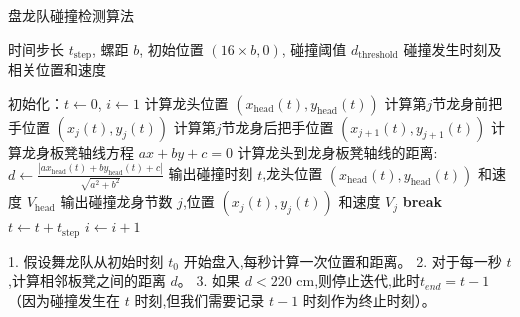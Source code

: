 \begin{breakablealgorithm}
	\caption{盘龙队碰撞检测算法}
	\begin{algorithmic}[1]
		\Require 时间步长 $t_{\text{step}}$, 螺距 $b$, 初始位置 $(16 \times b, 0)$, 碰撞阈值 $d_{\text{threshold}}$
		\Ensure 碰撞发生时刻及相关位置和速度
		
		\State 初始化：$t \gets 0$, $i \gets 1$
		\State 计算龙头位置 $(x_{\text{head}}(t), y_{\text{head}}(t))$
		\State 计算第$j$节龙身前把手位置 $(x_j(t), y_j(t))$
		\State 计算第$j$节龙身后把手位置 $(x_{j+1}(t), y_{j+1}(t))$
		\State 计算龙身板凳轴线方程 $ax + by + c = 0$
		\State 计算龙头到龙身板凳轴线的距离:
		\State $d \gets \frac{|a x_{\text{head}}(t) + b y_{\text{head}}(t) + c|}{\sqrt{a^2 + b^2}}$
		\State 输出碰撞时刻 $t$,龙头位置 $(x_{\text{head}}(t), y_{\text{head}}(t))$ 和速度 $V_{\text{head}}$
		\State 输出碰撞龙身节数 $j$,位置 $(x_j(t), y_j(t))$ 和速度 $V_j$
		\State \textbf{break}
		\EndIf
		\EndFor
		\State $t \gets t + t_{\text{step}}$
		\State $i \gets i + 1$
		\EndWhile
	\end{algorithmic}
\end{breakablealgorithm}


1. 假设舞龙队从初始时刻 \( t_0 \) 开始盘入,每秒计算一次位置和距离。
2. 对于每一秒 \( t \),计算相邻板凳之间的距离 \( d \)。
3. 如果 \( d < 220 \) cm,则停止迭代,此时\(t_{end} = t - 1 \)（因为碰撞发生在 \( t \) 时刻,但我们需要记录 \( t-1 \) 时刻作为终止时刻）。


